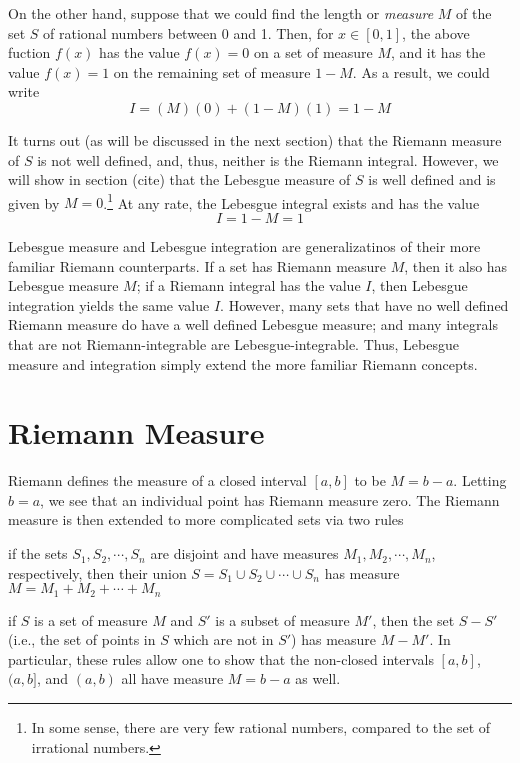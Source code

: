 On the other hand, suppose that we could find the length or
\emph{measure} $M$ of the set $S$ of rational numbers between 0 and 1.
Then, for $x \in [0, 1]$, the above fuction $f(x)$ has the value
$f(x) = 0$ on a set of measure $M$, and it has the value $f(x) = 1$ on
the remaining set of measure $1 - M$.  As a result, we could write
%
\begin{equation*}
  I = (M)(0) + (1-M)(1) = 1 - M
\end{equation*}
%

It turns out (as will be discussed in the next section) that the
Riemann measure of $S$ is not well defined, and, thus, neither is the
Riemann integral.  However, we will show in section (cite) that the
Lebesgue measure of $S$ is well defined and is given by
$M = 0$.\footnote{
  In some sense, there are very few rational numbers, compared to the
  set of irrational numbers.}
At any rate, the Lebesgue integral exists and has the value
%
\begin{equation*}
  I = 1 - M = 1
\end{equation*}
%

Lebesgue measure and Lebesgue integration are generalizatinos of their
more familiar Riemann counterparts.  If a set has Riemann measure $M$,
then it also has Lebesgue measure $M$; if a Riemann integral has the
value $I$, then Lebesgue integration yields the same value $I$.
However, many sets that have no well defined Riemann measure do have a
well defined Lebesgue measure; and many integrals that are not
Riemann-integrable are Lebesgue-integrable.  Thus, Lebesgue measure
and integration simply extend the more familiar Riemann concepts.
%
\section{Riemann Measure}
%
Riemann defines the measure of a closed interval $[a, b]$ to be
$M = b - a$.  Letting $b = a$, we see that an individual point has Riemann
measure zero.  The Riemann measure is then extended to more
complicated sets via two rules
\begin{enumerate*}
\item
  if the sets $S_1, S_2, \cdots, S_n$ are disjoint and have
  measures $M_1, M_2, \cdots, M_n$, respectively, then their union
  $S = S_1 \cup S_2 \cup \cdots \cup S_n$ has measure
  $M = M_1 + M_2 + \cdots + M_n$
\item
  if $S$ is a set of measure $M$ and $S'$ is a subset of measure
  $M\prime$, then the set $S - S'$ (i.e., the set of points in $S$
  which are not in $S'$) has measure $M - M'$.  In particular, these
  rules allow one to show that the non-closed intervals
  $[a, b]$, $(a, b]$, and $(a, b)$ all have measure $M = b - a$ as well.
\end{enumerate*}

